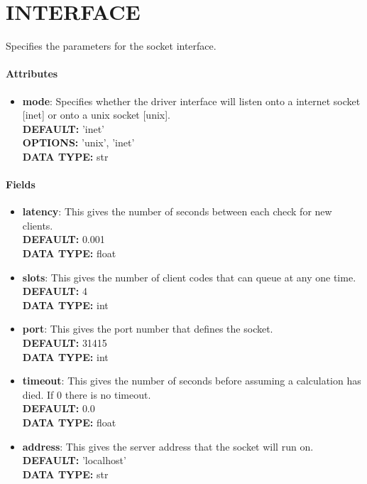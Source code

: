 \section{INTERFACE}
\label{INTERFACE}
Specifies the parameters for the socket interface.
\paragraph{Attributes}
 \begin{itemize}
\item {\bf mode}:
 Specifies whether the driver interface will listen onto a internet socket [inet] or onto a unix socket [unix].
{\\ \bf DEFAULT: }'inet'
{\\ \bf OPTIONS: }'unix', 'inet'
{\\ \bf DATA TYPE: }str
\end{itemize}
 
\paragraph{Fields}
 \begin{itemize}
\item {\bf latency}:
 This gives the number of seconds between each check for new clients.
{\\ \bf DEFAULT: }0.001
{\\ \bf DATA TYPE: }float
\item {\bf slots}:
 This gives the number of client codes that can queue at any one time.
{\\ \bf DEFAULT: }4
{\\ \bf DATA TYPE: }int
\item {\bf port}:
 This gives the port number that defines the socket.
{\\ \bf DEFAULT: }31415
{\\ \bf DATA TYPE: }int
\item {\bf timeout}:
 This gives the number of seconds before assuming a calculation has died. If 0 there is no timeout.
{\\ \bf DEFAULT: }0.0
{\\ \bf DATA TYPE: }float
\item {\bf address}:
 This gives the server address that the socket will run on.
{\\ \bf DEFAULT: }'localhost'
{\\ \bf DATA TYPE: }str
\end{itemize}
 
